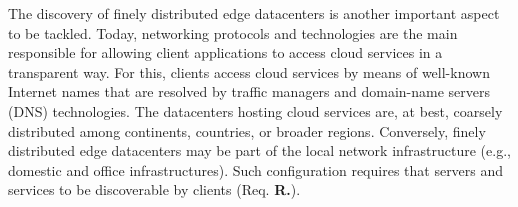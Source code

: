 The discovery of finely distributed edge datacenters is another important aspect to be tackled. Today, networking protocols and technologies are the main responsible for allowing client applications to access cloud services in a transparent way. For this, clients access cloud services by means of well-known Internet names that are resolved by traffic managers and domain-name servers (DNS) technologies. The datacenters hosting cloud services are, at best, coarsely distributed among continents, countries, or broader regions. Conversely, finely distributed edge datacenters may be part of the local network infrastructure (e.g., domestic and office infrastructures). Such configuration requires that servers and services to be discoverable by clients (Req. \textbf{R.}).










